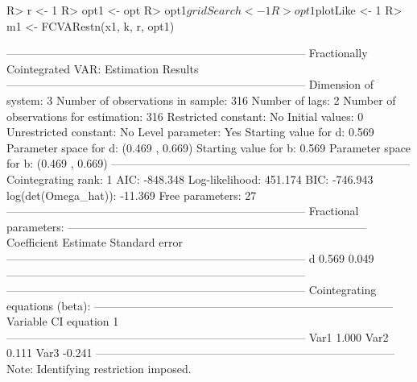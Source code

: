 \documentclass[article]{jss}
\begin{document}
\begin{CodeChunk} 
\begin{CodeInput}
R> r <- 1
R> opt1 <- opt
R> opt1$gridSearch <- 1
R> opt1$plotLike <- 1
R> m1 <- FCVARestn(x1, k, r, opt1)
\end{CodeInput}
\begin{CodeOutput}
--------------------------------------------------------------------------------
                      Fractionally Cointegrated VAR: Estimation Results                              
--------------------------------------------------------------------------------
Dimension of system:       3      Number of observations in sample:          316 
Number of lags:            2      Number of observations for estimation:     316 
Restricted constant:      No      Initial values:                              0
Unrestricted constant:    No      Level parameter:                           Yes
Starting value for d:    0.569    Parameter space for d: (0.469 , 0.669) 
Starting value for b:    0.569    Parameter space for b: (0.469 , 0.669) 
--------------------------------------------------------------------------------
Cointegrating rank:            1  AIC:              -848.348 
Log-likelihood:          451.174  BIC:              -746.943 
log(det(Omega_hat)):     -11.369  Free parameters:        27 
--------------------------------------------------------------------------------
    Fractional parameters:                                                                             
--------------------------------------------------------------------------------
    Coefficient               Estimate                Standard error 
--------------------------------------------------------------------------------
         d                       0.569                      0.049                
--------------------------------------------------------------------------------
--------------------------------------------------------------------------------
    Cointegrating equations (beta):                                                                  
--------------------------------------------------------------------------------
      Variable        CI equation 1  
--------------------------------------------------------------------------------
        Var1              1.000     
        Var2              0.111     
        Var3             -0.241     
--------------------------------------------------------------------------------
Note: Identifying restriction imposed.                                                               

\end{CodeOutput}
\end{CodeChunk}
\end{document}
